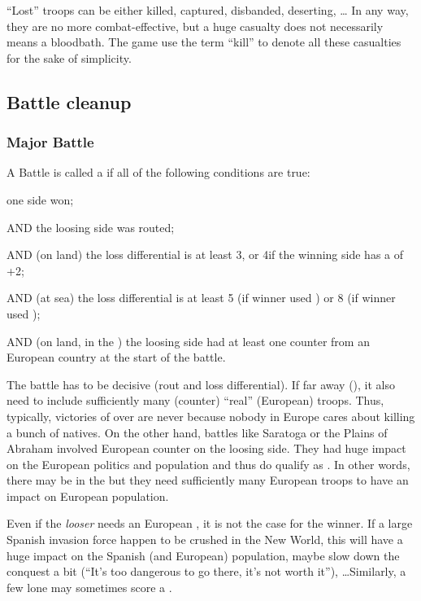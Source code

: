 \begin{designnote}
  ``Lost'' troops can be either killed, captured, disbanded, deserting, \ldots
  In any way, they are no more combat-effective, but a huge casualty does not
  necessarily means a bloodbath. The game use the term ``kill'' to denote all
  these casualties for the sake of simplicity.
\end{designnote}

\subsection{Battle cleanup}
\label{chMilitary:Battle:Cleanup}

\subsubsection{Major Battle}
A Battle is called a  if all of the following conditions
are true:
\begin{modlist}
\item one side won;
\item[AND] the loosing side was routed;
\item[AND] (on land) the loss differential is at least 3\LD, or 4\LD if the
  winning side has a  of +2;
\item[AND] (at sea) the loss differential is at least 5 (if winner used \NWD)
  or 8 (if winner used \NGD);
\item[AND] (on land, in the \ROTW) the loosing side had at least one \ARMY
  counter from an European country at the start of the battle.
\end{modlist}

\begin{designnote}
  The battle has to be decisive (rout and loss differential). If far away
  (\ROTW), it also need to include sufficiently many (\ARMY counter) ``real''
  (European) troops. Thus, typically, victories of \HIS over \paysAzteque are
  never  because nobody in Europe cares about killing a
  bunch of natives. On the other hand, battles like Saratoga or the Plains of
  Abraham involved European \ARMY counter on the loosing side. They had huge
  impact on the European politics and population and thus do qualify as
  . In other words, there may be  in
  the \ROTW but they need sufficiently many European troops to have an impact
  on European population.

  Even if the \emph{looser} needs an European \ARMY, it is not the case for
  the winner. If a large Spanish invasion force happen to be crushed in the
  New World, this will have a huge impact on the Spanish (and European)
  population, maybe slow down the conquest a bit (``It's too dangerous to go
  there, it's not worth it''), \ldots Similarly, a few lone \LD may sometimes
  score a .
\end{designnote}

